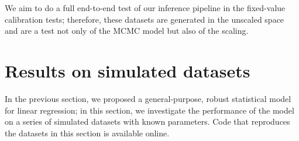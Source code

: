 \documentclass[fleqn,usenatbib]{mnras}
\begin{document}
We aim to do a full end-to-end test of our inference pipeline in the fixed-value
calibration tests; therefore, these datasets are generated in the unscaled space
and are a test not only of the MCMC model but also of the scaling.









\section{Results on simulated datasets}
\label{sec:results}

In the previous section, we proposed a general-purpose, robust statistical model
for linear regression; in this section, we investigate the performance of the
model on a series of simulated datasets with known parameters. Code that
reproduces the datasets in this section is available online\footnotemark.

\end{document}
